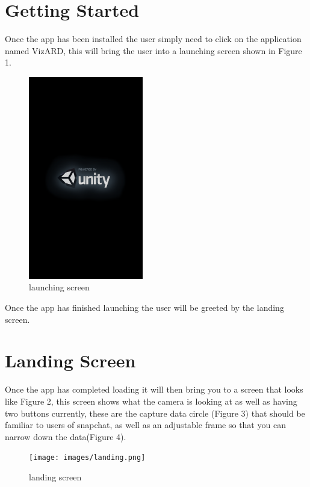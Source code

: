 \documentclass[a4paper,12pt]{article}
\begin{document}
\section{Getting Started}
Once the app has been installed the user simply need to click on the application named VizARD, this will bring the user into a launching screen shown in Figure 1.\\
\begin{figure}[H]
\centering
	\includegraphics[width=50mm]{images/launch.png}
	\caption{launching screen \label{overflow}}
\end{figure}

Once the app has finished launching the user will be greeted by the landing screen.
\newpage

\section{Landing Screen}
Once the app has completed loading it will then bring you to a screen that looks like Figure 2, this screen shows what the camera is looking at as well as having two buttons currently, these are the capture data circle (Figure 3) that should be familiar to users of snapchat, as well as an adjustable frame so that you can narrow down the data(Figure 4).

\begin{figure}[H]
\centering
	\texttt{[image: images/landing.png]}
	\caption{landing screen \label{overflow}}
\end{figure}
\end{document}
